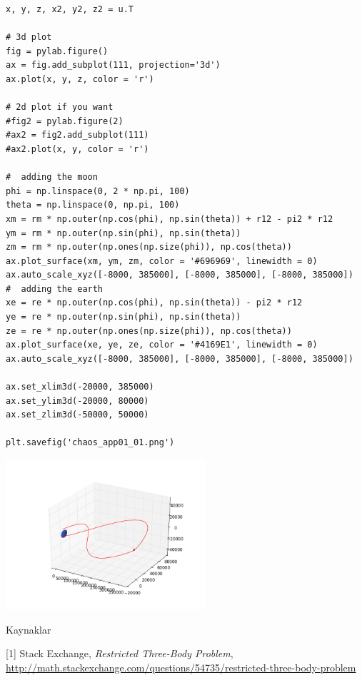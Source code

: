 \documentclass[12pt,fleqn]{article}\usepackage{../../common}
\begin{document}
\begin{verbatim}
x, y, z, x2, y2, z2 = u.T

# 3d plot
fig = pylab.figure()
ax = fig.add_subplot(111, projection='3d')
ax.plot(x, y, z, color = 'r')

# 2d plot if you want
#fig2 = pylab.figure(2)
#ax2 = fig2.add_subplot(111)
#ax2.plot(x, y, color = 'r')

#  adding the moon
phi = np.linspace(0, 2 * np.pi, 100)
theta = np.linspace(0, np.pi, 100)
xm = rm * np.outer(np.cos(phi), np.sin(theta)) + r12 - pi2 * r12
ym = rm * np.outer(np.sin(phi), np.sin(theta))
zm = rm * np.outer(np.ones(np.size(phi)), np.cos(theta))
ax.plot_surface(xm, ym, zm, color = '#696969', linewidth = 0)
ax.auto_scale_xyz([-8000, 385000], [-8000, 385000], [-8000, 385000])
#  adding the earth
xe = re * np.outer(np.cos(phi), np.sin(theta)) - pi2 * r12
ye = re * np.outer(np.sin(phi), np.sin(theta))
ze = re * np.outer(np.ones(np.size(phi)), np.cos(theta))
ax.plot_surface(xe, ye, ze, color = '#4169E1', linewidth = 0)
ax.auto_scale_xyz([-8000, 385000], [-8000, 385000], [-8000, 385000])

ax.set_xlim3d(-20000, 385000)
ax.set_ylim3d(-20000, 80000)
ax.set_zlim3d(-50000, 50000)

plt.savefig('chaos_app01_01.png')
\end{verbatim}





\includegraphics[width=20em]{chaos_app01_01.png}

Kaynaklar

[1] Stack Exchange, {\em Restricted Three-Body Problem}, \url{http://math.stackexchange.com/questions/54735/restricted-three-body-problem}
\end{document}
